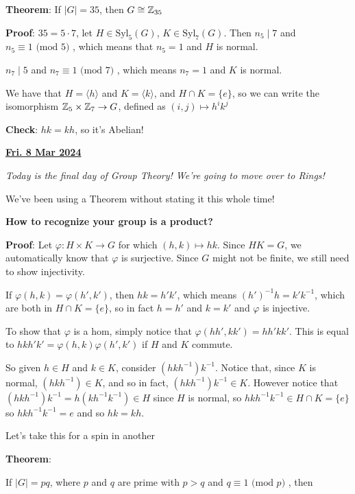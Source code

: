 \documentclass[12pt]{article}
\renewcommand{\date}[1]{\underline{\bf #1}}
\newcommand{\lr}[1]{\langle #1 \rangle}
\renewcommand{\mod}[1]{
  \text{ (mod $#1$) }
}
\begin{document}
{\bf Theorem}: If $|G| = 35$, then $G \cong {\mathbb Z}_{35}$

{\bf Proof}: $35 = 5 \cdot 7$, let $H \in \text{Syl}_5(G)$, $K \in
\text{Syl}_7(G)$. Then $n_5 \mid 7$ and $n_5 \equiv 1 \mod 5$, which means that
$n_5 = 1$ and $H$ is normal.

$n_7 \mid 5$ and $n_7 \equiv 1 \mod 7$, which means $n_7 = 1$  and $K$ is
normal.

We have that $H = \lr{h}$ and $K = \lr{k}$, and $H \cap K = \{e\}$, so we can
write the isomorphism ${\mathbb Z}_5 \times {\mathbb Z}_7 \to G$, defined as $(i, j) \mapsto h^i
k^j$

{\bf Check}: $hk = kh$, so it's Abelian!

\date{Fri. 8 Mar 2024}

{\it Today is the final day of Group Theory! We're going to move over to Rings!}

We've been using a Theorem without stating it this whole time!

{\bf How to recognize your group is a product?}


{\bf Proof}: Let $\varphi: H \times K \to G$ for which $(h, k) \mapsto hk$.
Since $HK = G$, we automatically know that $\varphi$ is surjective. Since $G$
might not be finite, we still need to show injectivity.

If $\varphi(h, k) = \varphi(h', k')$, then $hk = h'k'$, which means $(h')^{-1}h
= k'k^{-1}$, which are both in $H \cap K = \{e\}$, so in fact $h = h'$ and $k =
k'$ and $\varphi$ is injective.

To show that $\varphi$ is a hom, simply notice that $\varphi(hh', kk') =
hh'kk'$. This is equal to $hkh'k' = \varphi(h, k)\varphi(h', k')$ if $H$ and $K$
commute.

So given $h \in H$ and $k \in K$, consider $(hkh^{-1})k^{-1}$. Notice that,
since $K$ is normal, $(hkh^{-1}) \in K$, and so in fact, $(hkh^{-1})k^{-1} \in
K$. However notice that $(hkh^{-1})k^{-1} = h(kh^{-1}k^{-1}) \in H$ since $H$ is
normal, so $hkh^{-1}k^{-1} \in H \cap K = \{e\}$ so $hkh^{-1}k^{-1} = e$ and so
$hk = kh$.

Let's take this for a spin in another

{\bf Theorem}:

If $|G| = pq$, where $p$ and $q$ are prime with $p > q$ and $q \equiv 1 \mod
p$, then
\end{document}
